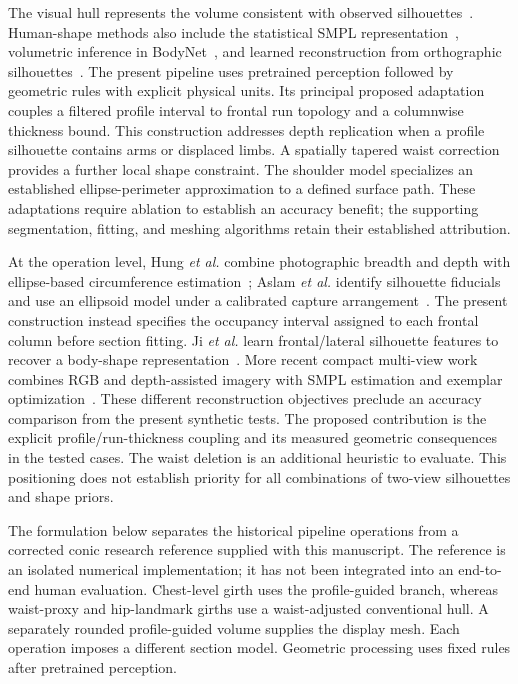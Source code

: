 \documentclass[11pt,a4paper]{article}
\begin{document}
The visual hull represents the volume consistent with observed silhouettes~\cite{laurentini1994visual}. Human-shape methods also include the statistical SMPL representation~\cite{loper2015smpl}, volumetric inference in BodyNet~\cite{varol2018bodynet}, and learned reconstruction from orthographic silhouettes~\cite{ji2019}. The present pipeline uses pretrained perception followed by geometric rules with explicit physical units. Its principal proposed adaptation couples a filtered profile interval to frontal run topology and a columnwise thickness bound. This construction addresses depth replication when a profile silhouette contains arms or displaced limbs. A spatially tapered waist correction provides a further local shape constraint. The shoulder model specializes an established ellipse-perimeter approximation to a defined surface path. These adaptations require ablation to establish an accuracy benefit; the supporting segmentation, fitting, and meshing algorithms retain their established attribution.

At the operation level, Hung \emph{et al.} combine photographic breadth and depth with ellipse-based circumference estimation~\cite{hung2004}; Aslam \emph{et al.} identify silhouette fiducials and use an ellipsoid model under a calibrated capture arrangement~\cite{aslam2017}. The present construction instead specifies the occupancy interval assigned to each frontal column before section fitting. Ji \emph{et al.} learn frontal/lateral silhouette features to recover a body-shape representation~\cite{ji2019}. More recent compact multi-view work combines RGB and depth-assisted imagery with SMPL estimation and exemplar optimization~\cite{chen2025compact}. These different reconstruction objectives preclude an accuracy comparison from the present synthetic tests. The proposed contribution is the explicit profile/run-thickness coupling and its measured geometric consequences in the tested cases. The waist deletion is an additional heuristic to evaluate. This positioning does not establish priority for all combinations of two-view silhouettes and shape priors.

The formulation below separates the historical pipeline operations from a corrected conic research reference supplied with this manuscript. The reference is an isolated numerical implementation; it has not been integrated into an end-to-end human evaluation. Chest-level girth uses the profile-guided branch, whereas waist-proxy and hip-landmark girths use a waist-adjusted conventional hull. A separately rounded profile-guided volume supplies the display mesh. Each operation imposes a different section model. Geometric processing uses fixed rules after pretrained perception.
\end{document}
